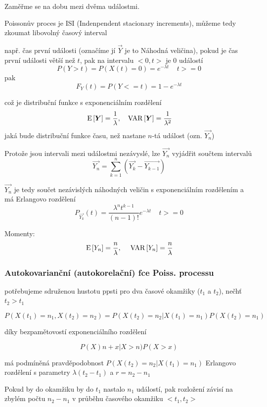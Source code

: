 Zaměřme se na dobu mezi dvěma událostmi.

Poissonův proces je ISI (Indenpendent stacionary increments), můžeme tedy zkoumat libovolný časový interval

např. čas první události (označíme jí $\vec{Y}$ je to Náhodná veličina), pokud je čas první události větší než $t$, pak na intervalu $<0,t>$ je 0 událostí \[ P(Y>t) = P(X(t) = 0) = e^{-\lambda t} \;\;\;\; t >= 0 \]
pak \[ F_Y(t) = P(Y <= t ) = 1 - e^{-\lambda t} \]

což je  distribuční funkce s exponenciálním rozdělení \[ \,\mathrm{E}\left[\boldsymbol{Y}\right] = \frac{1}{\lambda}, \;\;\; \,\mathrm{VAR}\left[\boldsymbol{Y}\right] = \frac{1}{\lambda^2} \]
jaká bude distribuční funkce času, než nastane $n$-tá událost (ozn. $\vec{Y_n}$)

Protože jsou intervali mezi událostmi nezávyslé, lze $\vec{Y_n}$ vyjádřit  součtem intervalů \[ \vec{Y_n} = \sum_{k=1}^n (\vec{Y_k} -\vec{Y_{k-1}}) \]

$\vec{Y_n}$ je tedy součet nezávislých náhodných veličin s exponenciálním rozdělením a má Erlangovo rozdělení \[ P_{\vec{Y_k}} (t) = \dfrac{\lambda^n t^{k-1}}{(n-1)!} e^{-\lambda t} \;\;\;\; t >= 0 \]

Momenty: \[ \,\mathrm{E}\left[Y_n\right] = \frac{n}{\lambda},  \;\;\;\; \,\mathrm{VAR}\left[Y_n\right] = \frac{n}{\lambda}  \]



\subsubsection{Autokovarianční (autokorelační) fce Poiss. processu}
\label{subs:Autokovarianční (autokorelační) fce Poiss. processu}

potřebujeme sdruženou hustotu ppsti pro dva časové okamžiky ($t_1$ a $t_2$), nečhť $t_2 > t_1$

\[ P(X(t_1) = n_1, X(t_2) = n_2) = P(X(t_2)=n_2 | X(t_1)=n_1 ) P(X(t_2)=n_1 ) \]


díky bezpamětovostí exponenciálního rozdělení

\[ P(X ) n+ x | X > n) P(X>x) \]

má podmíněná pravděpodobnost $P(X(t_2)=n_2| X(t_1)=n_1)$ Erlangovo rozdělení s parametry $\lambda (t_2 -t_1)$ a $r = n_2 - n_1$

Pokud by do okamžiku by do $t_1$ nastalo $n_1$ událostí, pak rozložení závisí na zbylém počtu $n_2-n_1$ v průběhu časového okamžiku $<t_1,t_2>$



